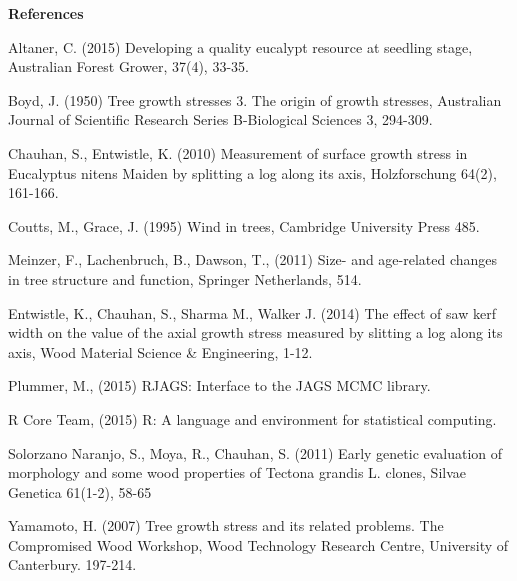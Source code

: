 \textbf{References}

Altaner, C. (2015) Developing a quality eucalypt resource at seedling stage, Australian Forest Grower, 37(4), 33-35. 

Boyd, J. (1950) Tree growth stresses 3. The origin of growth stresses, Australian Journal of Scientific Research Series B-Biological Sciences 3, 294-309.

Chauhan, S., Entwistle, K. (2010) Measurement of surface growth stress in Eucalyptus nitens Maiden by splitting a log along its axis, Holzforschung 64(2), 161-166.

Coutts, M., Grace, J. (1995) Wind in trees, Cambridge University Press 485. 

Meinzer, F., Lachenbruch, B., Dawson, T., (2011) Size- and age-related changes in tree structure and function, Springer Netherlands, 514.

Entwistle, K., Chauhan, S., Sharma M., Walker J. (2014) The effect of saw kerf width on the value of the axial growth stress measured by slitting a log along its axis, Wood Material Science & Engineering, 1-12.

Plummer, M., (2015) RJAGS: Interface to the JAGS MCMC library. 

R Core Team, (2015) R: A language and environment for statistical computing.

Solorzano Naranjo, S., Moya, R., Chauhan, S. (2011) Early genetic evaluation of morphology and some wood properties of Tectona grandis L. clones, Silvae Genetica 61(1-2), 58-65

Yamamoto, H. (2007) Tree growth stress and its related problems. The Compromised Wood Workshop, Wood Technology Research Centre, University of Canterbury. 197-214.
